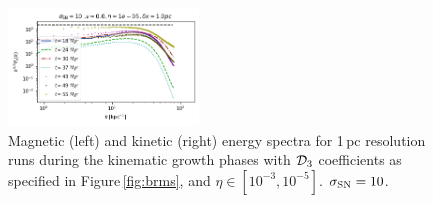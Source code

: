 \documentclass[iop,apj,numberedappendix,twocolappendix]{emulateapj}
\begin{document}
\begin{figure}
\includegraphics[trim=0.0cm 0.00cm 0.0cm 0.0cm,clip=true,width=0.45\textwidth]{csc_figs/1pcPm0e-5_0kpower.png}
\caption{
Magnetic (left) and kinetic (right) energy spectra for 1\,pc resolution runs 
during the kinematic growth phases with ${\cal D}_3$ 
coefficients as specified in Figure\,\ref{fig:brms}, and $\eta\in[10^{-3},10^{-5}]$. $\sigma_{\rm SN}=10$.
\label{fig:4spectraRm}
}
\end{figure}
\end{document}
